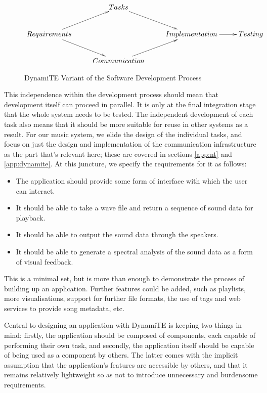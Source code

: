 \begin{figure}  
  \centering
\[\CompileMatrices
\xymatrix{
& Tasks \ar@{->}[rd] & & \\
Requirements \ar@{->}[ru] \ar@{->}[rd] &
&
Implementation \ar@{->}[r] &
Testing \\
& Communication \ar@{->}[ru] & & \\
}
\]
  \caption{DynamiTE Variant of the Software Development Process}
  \label{fig:process2}
\end{figure}

This independence within the development process should mean that
development itself can proceed in parallel.  It is only at the final
integration stage that the whole system needs to be tested.  The
independent development of each task also means that it should be more
suitable for reuse in other systems as a result.  For our music
system, we elide the design of the individual tasks, and focus on just
the design and implementation of the communication infrastructure as
the part that's relevant here; these are covered in sections
\ref{app:nt} and \ref{app:dynamite}.  At this juncture, we specify the
requirements for it as follows:

\begin{itemize}
\item The application should provide some form of interface with which
  the user can interact.
\item It should be able to take a wave file and return a sequence of
  sound data for playback.
\item It should be able to output the sound data through the speakers.
\item It should be able to generate a spectral analysis of the sound
  data as a form of visual feedback.
\end{itemize}

This is a minimal set, but is more than enough to demonstrate the
process of building up an application.  Further features could be
added, such as playlists, more visualisations, support for further
file formats, the use of tags and web services to provide song
metadata, etc.

Central to designing an application with DynamiTE is keeping two
things in mind; firstly, the application should be composed of
components, each capable of performing their own task, and secondly,
the application itself should be capable of being used as a component
by others.  The latter comes with the implicit assumption that the
application's features are accessible by others, and that it remains
relatively lightweight so as not to introduce unnecessary and
burdensome requirements.

